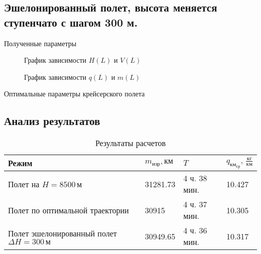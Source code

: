 \subsection{Эшелонированный полет, высота меняется ступенчато с шагом 300 м.}

\begin{table}[H]
    \centering
    \caption{Полученные параметры}
    \label{tab:H_300_V_opt}
    
\end{table}

\begin{figure}[H]
    \begin{minipage}{0.49\textwidth}
    \centering
    \resizebox{\textwidth}{!}{}
    \caption{График зависимости $H(L)$ и $V(L)$}
    \label{fig:FL_H_V_opt}
    \end{minipage}
    \hfill
    \begin{minipage}{0.49\textwidth}
    \centering
    \resizebox{\textwidth}{!}{}
    \caption{График зависимости $q(L)$ и $m(L)$}
    \label{fig:H_300_L_m}
    \end{minipage}
\end{figure}

\begin{table}[H]
\centering
\resizebox{\textwidth-1.4cm}{!}{
    
}
\caption{Оптимальные параметры крейсерского полета}
\label{t:1}
\end{table}


\subsection{Анализ результатов}
\begin{table}[H]
\centering
\caption{Результаты расчетов}
\label{tab:tab:opt_vs_const_h}
\begin{tabular}{|p{}|p{}|p{}|p{}|}
\hline
Режим & $m_{изр}, км$ & $T$ & $q_{км_{ср}}, \, \frac{кг}{км}$\\
\hline
Полет на $H=8500\,м$ & 31281.73 & 4 ч. 38 мин. & 10.427\\
\hline
Полет по оптимальной траектории & 30915 & 4 ч. 37 мин. & 10.305\\
\hline
Полет эшелонированный полет $\Delta H =300\, м$ & 30949.65 & 4 ч. 36 мин. & 10.317\\
\hline
\end{tabular}
\end{table}

